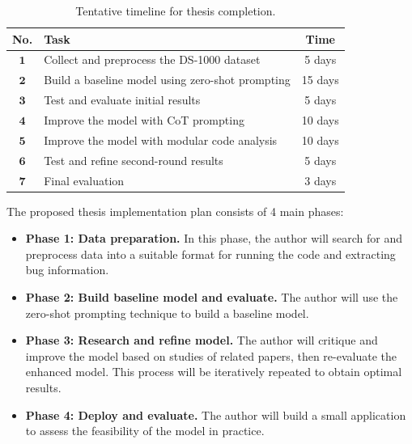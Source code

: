 \documentclass[a4paper,oneside]{book}
\begin{document}
\begin{table}[H]
    \caption{Tentative timeline for thesis completion.}
    \begin{center}
        \begin{tabular}{clc}
            \hline
            No.          & Task                                             & Time    \\
            \hline\hline
            $\mathbf{1}$ & Collect and preprocess the DS-1000 dataset       & 5 days  \\
            \hline
            $\mathbf{2}$ & Build a baseline model using zero-shot prompting & 15 days \\
            \hline
            $\mathbf{3}$ & Test and evaluate initial results                & 5 days  \\
            \hline
            $\mathbf{4}$ & Improve the model with CoT prompting             & 10 days \\
            \hline
            $\mathbf{5}$ & Improve the model with modular code analysis     & 10 days \\
            \hline
            $\mathbf{6}$ & Test and refine second-round results             & 5 days  \\
            \hline
            $\mathbf{7}$ & Final evaluation                                 & 3 days  \\
            \hline
        \end{tabular}
    \end{center}
\end{table}

The proposed thesis implementation plan consists of 4 main phases:

\begin{itemize}
    \item \textbf{Phase 1: Data preparation.} In this phase, the author will search for and preprocess data into a suitable format for running the code and extracting bug information.

    \item \textbf{Phase 2: Build baseline model and evaluate.} The author will use the zero-shot prompting technique to build a baseline model.

    \item \textbf{Phase 3: Research and refine model.} The author will critique and improve the model based on studies of related papers, then re-evaluate the enhanced model. This process will be iteratively repeated to obtain optimal results.

    \item \textbf{Phase 4: Deploy and evaluate.} The author will build a small application to assess the feasibility of the model in practice.
\end{itemize}
\end{document}
